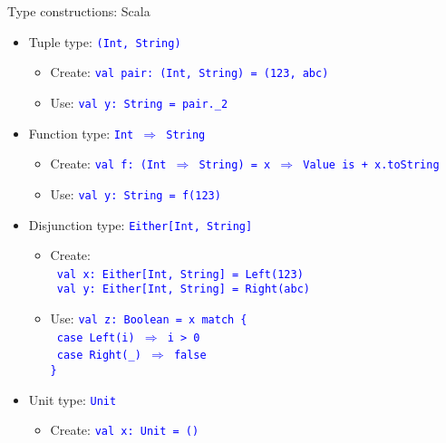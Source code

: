 \documentclass[english]{beamer}
\begin{document}
\begin{frame}{Type constructions: Scala}

\begin{itemize}
\item Tuple type: \texttt{\textcolor{blue}{\footnotesize{}(Int, String)}}{\footnotesize \par}
\begin{itemize}
\item Create: \texttt{\textcolor{blue}{\footnotesize{}val pair:\ (Int,
String) = (123, \textquotedbl{}abc\textquotedbl{})}} 
\item Use: \texttt{\textcolor{blue}{\footnotesize{}val y:\ String = pair.\_2}}{\footnotesize \par}
\end{itemize}
\item Function type: \texttt{\textcolor{blue}{\footnotesize{}Int $\Rightarrow$
String}}{\footnotesize \par}
\begin{itemize}
\item Create: \texttt{\textcolor{blue}{\footnotesize{}val f:\ (Int $\Rightarrow$
String) = x $\Rightarrow$ \textquotedbl{}Value is \textquotedbl{}
+ x.toString}} 
\item Use: \texttt{\textcolor{blue}{\footnotesize{}val y:\ String = f(123)}}{\footnotesize \par}
\end{itemize}
\item Disjunction type: \texttt{\textcolor{blue}{\footnotesize{}Either{[}Int,
String{]}}}{\footnotesize \par}
\begin{itemize}
\item Create:\\
 \texttt{\textcolor{blue}{\footnotesize{}\ val x:\ Either{[}Int,
String{]} = Left(123)}}~\\
\texttt{\textcolor{blue}{\footnotesize{} val y:\ Either{[}Int, String{]}
= Right(\textquotedbl{}abc\textquotedbl{})}}{\footnotesize \par}
\item Use: \texttt{\textcolor{blue}{\footnotesize{}val z:\ Boolean = x
match \{}}~\\
\texttt{\textcolor{blue}{\footnotesize{} case Left(i) $\Rightarrow$
i > 0}}~\\
\texttt{\textcolor{blue}{\footnotesize{} case Right(\_) $\Rightarrow$
false}}~\\
\texttt{\textcolor{blue}{\footnotesize{}\}}}{\footnotesize \par}
\end{itemize}
\item Unit type: \texttt{\textcolor{blue}{\footnotesize{}Unit}}{\footnotesize \par}
\begin{itemize}
\item Create: \texttt{\textcolor{blue}{\footnotesize{}val x:\ Unit = ()}}{\footnotesize \par}
\end{itemize}
\end{itemize}
\end{frame}
\end{document}
